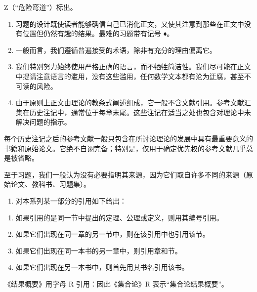 Z（“危险弯道”）标出。

\begin{enumerate}
\def\labelenumi{\arabic{enumi}.}
\setcounter{enumi}{6}
\item
  习题的设计既使读者能够确信自己已消化正文，又使其注意到那些在正文中没有位置但仍然有趣的结果。最难的习题带有记号 ♦。
\item
  一般而言，我们遵循普遍接受的术语，除非有充分的理由偏离它。
\item
  我们特别努力始终使用严格正确的语言，而不牺牲简洁性。我们尽可能在正文中提请注意语言的滥用，没有这些滥用，任何数学文本都有沦为迂腐，甚至不可读的风险。
\item
  由于原则上正文由理论的教条式阐述组成，它一般不含文献引用。参考文献汇集在历史注记中，通常位于每章末尾。这些注记在适当之处也包含对理论中未解决问题的指示。
\end{enumerate}

每个历史注记之后的参考文献一般只包含在所讨论理论的发展中具有最重要意义的书籍和原始论文。它绝不自诩完备；特别是，仅用于确定优先权的参考文献几乎总是被省略。

至于习题，我们一般认为没有必要指明其来源，因为它们取自许多不同的来源（原始论文、教科书、习题集）。

\begin{enumerate}
\def\labelenumi{\arabic{enumi}.}
\setcounter{enumi}{10}
\tightlist
\item
  对本系列某一部分的引用如下给出：
\end{enumerate}

\begin{enumerate}
\def\labelenumi{\alph{enumi})}
\item
  如果引用的是同一节中提出的定理、公理或定义，则用其编号引用。
\item
  如果它们出现在同一章的另一节中，则在该引用中也引用该节。
\item
  如果它们出现在同一本书的另一章中，则引用章和节。
\item
  如果它们出现在另一本书中，则首先用其书名引用该书。
\end{enumerate}

《结果概要》用字母 R 引用：因此《集合论》R 表示“集合论结果概要”。

